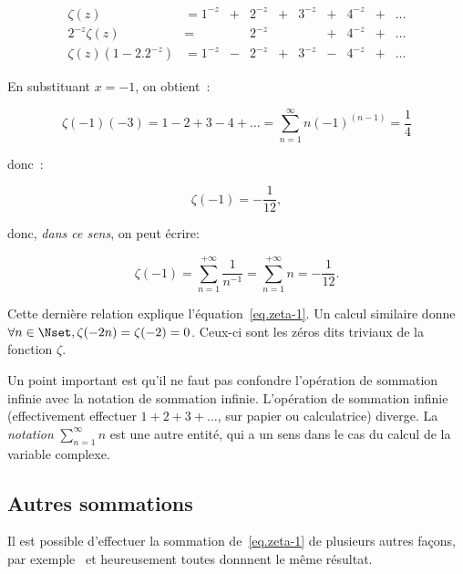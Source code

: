 \begin{equation}
\begin{array}{rlllllllll}
\zeta(z)             &= 1^{-z} &+& 2^{-z} &+& 3^{-z} &+& 4^{-z} &+& \ldots\\
2^{-z}\zeta(z)       &=        & & 2^{-z} & &        &+& 4^{-z} &+& \ldots\\
\zeta(z)(1-2.2^{-z}) &= 1^{-z} &-& 2^{-z} &+& 3^{-z} &-& 4^{-z} &+& \ldots
\end{array} 
\end{equation}

En substituant $x=-1$, on obtient~:

\begin{equation}
\zeta(-1)(-3) = 1 - 2 + 3 - 4 + \ldots = \sum_{n=1}^\infty n(-1)^{(n-1)} = \frac{1}{4}
\end{equation}

donc~:

\begin{equation}
\zeta(-1) = -\frac{1}{12},
\end{equation}

donc, {\em dans ce sens}, on peut écrire:

\begin{equation}
\zeta(-1) = \sum_{n=1}^{+\infty} \frac{1}{n^{-1}} = \sum_{n=1}^{+\infty} n = -\frac{1}{12}.
\end{equation}

Cette dernière relation explique l'équation~\eqref{eq.zeta-1}. Un calcul similaire donne $\forall n \in \Nset, \zeta(-2n) = \zeta(-2) =  0$. Ceux-ci sont les zéros dits \og triviaux \fg de la fonction $\zeta$.

Un point important est qu'il ne faut pas confondre l'opération de sommation infinie avec la notation de sommation infinie. L'opération de sommation infinie (effectivement effectuer $1+2+3+\ldots$, sur papier ou calculatrice) diverge. La {\em notation} $\sum_{n=1}^{\infty} n$ est une autre entité, qui a un sens dans le cas du calcul de la variable complexe.

\subsection{Autres sommations}
Il est possible d'effectuer la sommation de~\eqref{eq.zeta-1} de plusieurs autres fa\c{c}ons, par exemple~\cite{Ramanujan} et heureusement toutes donnnent le même résultat.